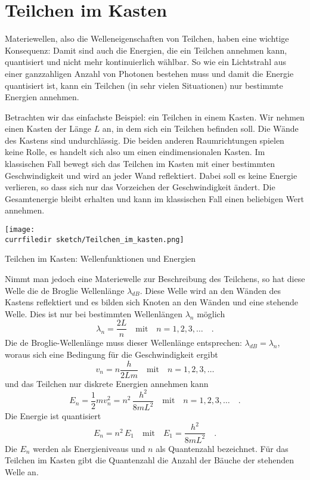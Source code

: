 \section{Teilchen im Kasten}

 Materiewellen, also die Welleneigenschaften von Teilchen, haben eine wichtige Konsequenz: Damit sind auch die Energien, die ein Teilchen annehmen kann, quantisiert und nicht mehr kontinuierlich wählbar. So wie ein Lichtstrahl aus einer ganzzahligen Anzahl von Photonen bestehen muss und damit die Energie quantisiert ist, kann ein Teilchen (in sehr vielen Situationen) nur bestimmte Energien annehmen.

 Betrachten wir das einfachste Beispiel: ein Teilchen in einem Kasten. Wir nehmen einen Kasten der Länge $L$ an, in dem sich ein Teilchen befinden soll. Die Wände des Kastens sind undurchlässig. Die beiden anderen Raumrichtungen spielen keine Rolle, es handelt sich also um einen eindimensionalen Kasten. Im klassischen Fall bewegt sich das Teilchen im Kasten mit einer bestimmten Geschwindigkeit und wird an jeder Wand reflektiert. Dabei soll es keine Energie verlieren, so dass sich nur das Vorzeichen der Geschwindigkeit ändert. Die Gesamtenergie bleibt erhalten und kann im klassischen Fall einen beliebigen Wert annehmen.


 \begin{marginfigure}
    \texttt{[image: \\currfiledir sketch/Teilchen\_im\_kasten.png]}
    \caption{Teilchen im Kasten: Wellenfunktionen und Energien}
 \end{marginfigure}

Nimmt man jedoch eine Materiewelle zur Beschreibung des Teilchens, so hat diese Welle die de Broglie Wellenlänge $\lambda_{dB}$. Diese Welle wird an den Wänden des Kastens reflektiert und es bilden sich Knoten an den Wänden und eine stehende Welle. Dies ist nur bei bestimmten Wellenlängen $\lambda_n$ möglich
\begin{equation}
    \lambda_n = \frac{2L}{n} \quad \text{mit} \quad n = 1, 2, 3, \dots \quad .
\end{equation}
Die de Broglie-Wellenlänge muss dieser Wellenlänge entsprechen: $\lambda_{dB} = \lambda_n$, woraus sich eine Bedingung für die Geschwindigkeit ergibt
\begin{equation}
    v_n = n \frac{h}{2 L m} \quad \text{mit} \quad n = 1, 2, 3, \dots
\end{equation}
und das Teilchen nur diskrete Energien annehmen kann
\begin{equation}
    E_n = \frac{1}{2} m v_n^2 = n^2 \, \frac{h^2}{8 m L^2} \quad \text{mit} \quad n = 1, 2, 3, \dots \quad .
\end{equation}
Die Energie ist quantisiert 
\begin{equation}
    E_n = n^2 \, E_1\quad \text{mit} \quad E_1 = \frac{h^2}{8 m L^2}  \quad .
\end{equation}
Die $E_n$ werden als Energieniveaus und $n$ als Quantenzahl bezeichnet. Für das Teilchen im Kasten gibt die Quantenzahl die Anzahl der Bäuche der stehenden Welle an.

